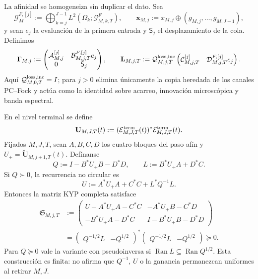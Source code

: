 La afinidad se homogeneiza sin duplicar el dato. Sea
\[
 \mathscr G_M^{F,[j]}
 :=\bigoplus_{k=j}^{J-1}L^2(\Omega_k;\mathscr G^F_{M,k,T}),
 \qquad
 \mathbf x_{M,j}:=x_{M,j}\oplus(g_{M,j},\ldots,g_{M,J-1}),
\]
y sean \(e_j\) la evaluación de la primera entrada y \(\mathsf S_j\) el
desplazamiento de la cola. Definimos
\begin{equation}
 \mathbf\Gamma_{M,j}
 :=\begin{pmatrix}
  \mathcal A_{M,j}^{[j]}&\mathcal B_{M,j,T}^{F,[j]}e_j\\
  0&\mathsf S_j
 \end{pmatrix},
 \qquad
 \mathbf L_{M,j,T}
 :=\mathcal Q_{M,j,T}^{\rm loss,inc}
 \begin{pmatrix}
  \mathcal C_{M,j,T}^{[j]}&\mathcal D_{M,j,T}^{F,[j]}e_j
 \end{pmatrix}.
 \label{eq:ns-import-homogeneous-affine-step}
\end{equation}
Aquí \(\mathcal Q_{M,0,T}^{\rm loss,inc}=I\); para \(j>0\) elimina
únicamente la copia heredada de los canales PC--Fock y actúa como la identidad
sobre acarreo, innovación microscópica y banda espectral.

\begin{theorem}
\label{thm:ns-import-affine-stein}
En el nivel terminal se define
\begin{equation}
 \mathbf U_{M,J,T}(t)
 :=(\mathcal E_{M,J,T}^{\rm term}(t))^*
   \mathcal E_{M,J,T}^{\rm term}(t).
 \label{eq:ns-import-terminal-metric}
\end{equation}
Fijados \(M,J,T\), sean \(A,B,C,D\) los cuatro bloques del paso afín y
\(U_+=\widetilde{\mathbf U}_{M,j+1,T}(t)\). Defínanse
\begin{equation}
 Q:=I-B^*U_+B-D^*D,
 \qquad L:=B^*U_+A+D^*C.
 \label{eq:ns-import-kyp-q-l}
\end{equation}
Si \(Q\succ0\), la recurrencia no circular es
\begin{equation}
 U:=A^*U_+A+C^*C+L^*Q^{-1}L.
 \label{eq:ns-import-affine-stein}
\end{equation}
Entonces la matriz KYP completa satisface
\begin{equation}
 \begin{aligned}
 \mathfrak S_{M,j,T}
 &:=
 \begin{pmatrix}
 U-A^*U_+A-C^*C&-A^*U_+B-C^*D\\
 -B^*U_+A-D^*C&I-B^*U_+B-D^*D
 \end{pmatrix}\\
 &=
 \begin{pmatrix}Q^{-1/2}L&-Q^{1/2}\end{pmatrix}^{*}
 \begin{pmatrix}Q^{-1/2}L&-Q^{1/2}\end{pmatrix}
 \succeq0.
 \end{aligned}
 \label{eq:ns-import-affine-supply}
\end{equation}
Para \(Q\succeq0\) vale la variante con pseudoinversa si
\(\operatorname{Ran}L\subseteq\operatorname{Ran}Q^{1/2}\). Esta construcción
es finita: no afirma que \(Q^{-1}\), \(U\) o la ganancia permanezcan
uniformes al retirar \(M,J\).
\end{theorem}

